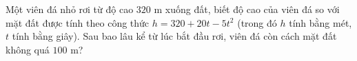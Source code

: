 \begin{bt}%
	Một viên đá nhỏ rơi từ độ cao $320$ m xuống đất, biết độ cao của viên đá so với mặt đất được tính theo công thức $h=320+20t-5t^2$ (trong đó $h$ tính bằng mét, $t$ tính bằng giây). Sau bao lâu kể từ lúc bắt đầu rơi, viên đá còn cách mặt đất không quá $100$ m?
\end{bt}

